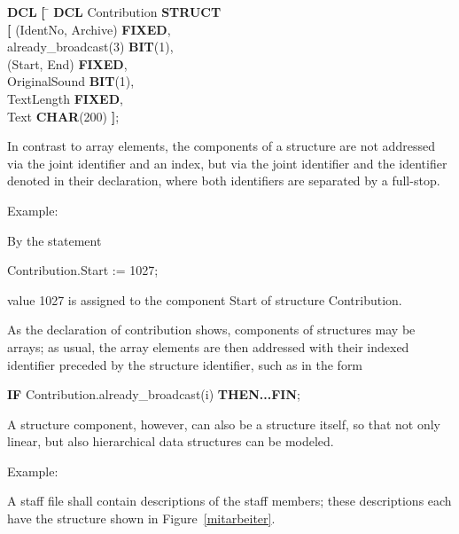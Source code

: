 \begin{tabbing}
{\bf DCL} \= {\bf [} \= \kill
{\bf DCL} \>         \> Contribution {\bf STRUCT} \\
          \> {\bf [} \> (IdentNo, Archive) {\bf FIXED},\\
          \>         \> already\_broadcast(3) {\bf BIT}(1),\\
          \>         \> (Start, End) {\bf FIXED},\\
          \>         \> OriginalSound {\bf BIT}(1),\\
          \>         \> TextLength {\bf FIXED},\\
          \>         \> Text {\bf CHAR}(200) {\bf ]};
\end{tabbing}


In contrast to array elements, the components of a structure are not
addressed via the joint identifier and an index, but via the joint
identifier and the identifier denoted in their declaration, where both
identifiers are separated by a full-stop.

Example:

By the statement

Contribution.Start := 1027;

value 1027 is assigned to the component Start of structure Contribution.

As the declaration of contribution shows, components of structures may be
arrays; as usual, the array elements are then addressed with their
indexed identifier preceded by the structure identifier, such as in the
form

{\bf IF} Contribution.already\_broadcast(i) {\bf THEN...FIN};

A structure component, however, can also be a structure itself, so that not only
linear, but also hierarchical data structures can be modeled.

Example:

A staff file shall contain descriptions of the staff members; these
descriptions each have the structure shown in Figure~\ref{mitarbeiter}.
\newpage

